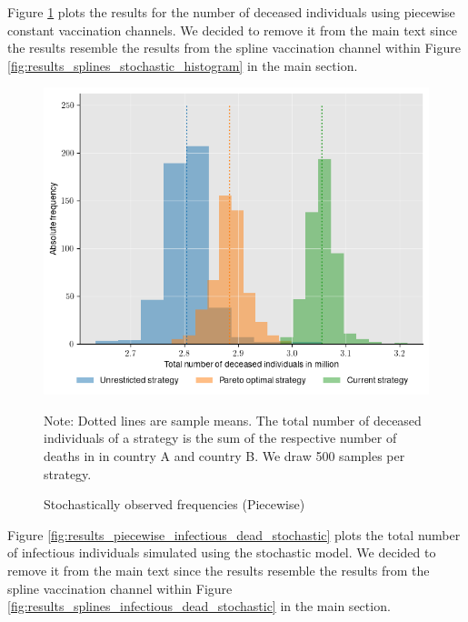 Figure \ref{fig:results_piecewise_stochastic_histogram} plots the results for the number of deceased individuals using piecewise constant vaccination channels. We decided to remove it from the main text since the results resemble the results from the spline vaccination channel within Figure \ref{fig:results_splines_stochastic_histogram} in the main section.
\begin{figure}[h!]
\centering
\includegraphics[scale=0.65]{images/piecewise_stochastic_histogram.png}\\
\begin{flushleft}
\scriptsize{Note:} Dotted lines are sample means. The total number of deceased individuals of a strategy is the sum of the respective number of deaths in in country A and country B. We draw 500 samples per strategy. 
\end{flushleft}
\caption{Stochastically observed frequencies (Piecewise)}
\label{fig:results_piecewise_stochastic_histogram}
\end{figure}

Figure \ref{fig:results_piecewise_infectious_dead_stochastic} plots the total number of infectious individuals simulated using the stochastic model. We decided to remove it from the main text since the results resemble the results from the spline vaccination channel within Figure \ref{fig:results_splines_infectious_dead_stochastic} in the main section.\\

